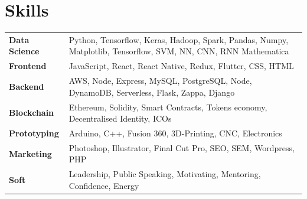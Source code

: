 \documentclass[11pt]{article}
\begin{document}
\section*{Skills}
\begin{tabularx}{\textwidth}{lX}
  \textbf{Data Science} & Python, Tensorflow, Keras, Hadoop, Spark, Pandas, Numpy, Matplotlib, Tensorflow, SVM,
                          NN, CNN, RNN
                          Mathematica \\
  \textbf{Frontend}     & JavaScript, React, React Native, Redux, Flutter, CSS, HTML  \\
  \textbf{Backend}      & AWS, Node, Express, MySQL, PostgreSQL, Node, DynamoDB,
                          Serverless, Flask, Zappa, Django \\
  \textbf{Blockchain}   & Ethereum, Solidity, Smart Contracts, Tokens economy,
                          Decentralised Identity, ICOs \\
  \textbf{Prototyping}  & Arduino, C++, Fusion 360, 3D-Printing, CNC, Electronics \\
  \textbf{Marketing}    & Photoshop, Illustrator, Final Cut Pro, SEO, SEM, Wordpress, PHP \\
  \textbf{Soft}         & Leadership, Public Speaking, Motivating, Mentoring, Confidence, Energy
\end{tabularx}
\end{document}
